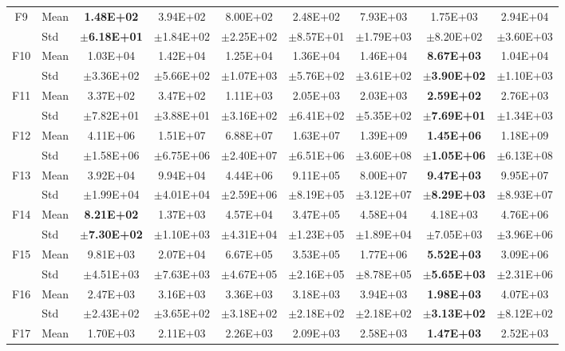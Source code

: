 \begin{table}[htbp]
{\begin{tabular}{clccccccc}
F9 & Mean & \textbf{1.48E+02} & 3.94E+02 & 8.00E+02 & 2.48E+02 & 7.93E+03 & 1.75E+03 & 2.94E+04 \\
 & Std & $\pm$\textbf{6.18E+01} & $\pm$1.84E+02 & $\pm$2.25E+02 & $\pm$8.57E+01 & $\pm$1.79E+03 & $\pm$8.20E+02 & $\pm$3.60E+03 \\
F10 & Mean & 1.03E+04 & 1.42E+04 & 1.25E+04 & 1.36E+04 & 1.46E+04 & \textbf{8.67E+03} & 1.04E+04 \\
 & Std & $\pm$3.36E+02 & $\pm$5.66E+02 & $\pm$1.07E+03 & $\pm$5.76E+02 & $\pm$3.61E+02 & $\pm$\textbf{3.90E+02} & $\pm$1.10E+03 \\
F11 & Mean & 3.37E+02 & 3.47E+02 & 1.11E+03 & 2.05E+03 & 2.03E+03 & \textbf{2.59E+02} & 2.76E+03 \\
 & Std & $\pm$7.82E+01 & $\pm$3.88E+01 & $\pm$3.16E+02 & $\pm$6.41E+02 & $\pm$5.35E+02 & $\pm$\textbf{7.69E+01} & $\pm$1.34E+03 \\
F12 & Mean & 4.11E+06 & 1.51E+07 & 6.88E+07 & 1.63E+07 & 1.39E+09 & \textbf{1.45E+06} & 1.18E+09 \\
 & Std & $\pm$1.58E+06 & $\pm$6.75E+06 & $\pm$2.40E+07 & $\pm$6.51E+06 & $\pm$3.60E+08 & $\pm$\textbf{1.05E+06} & $\pm$6.13E+08 \\
F13 & Mean & 3.92E+04 & 9.94E+04 & 4.44E+06 & 9.11E+05 & 8.00E+07 & \textbf{9.47E+03} & 9.95E+07 \\
 & Std & $\pm$1.99E+04 & $\pm$4.01E+04 & $\pm$2.59E+06 & $\pm$8.19E+05 & $\pm$3.12E+07 & $\pm$\textbf{8.29E+03} & $\pm$8.93E+07 \\
F14 & Mean & \textbf{8.21E+02} & 1.37E+03 & 4.57E+04 & 3.47E+05 & 4.58E+04 & 4.18E+03 & 4.76E+06 \\
 & Std & $\pm$\textbf{7.30E+02} & $\pm$1.10E+03 & $\pm$4.31E+04 & $\pm$1.23E+05 & $\pm$1.89E+04 & $\pm$7.05E+03 & $\pm$3.96E+06 \\
F15 & Mean & 9.81E+03 & 2.07E+04 & 6.67E+05 & 3.53E+05 & 1.77E+06 & \textbf{5.52E+03} & 3.09E+06 \\
 & Std & $\pm$4.51E+03 & $\pm$7.63E+03 & $\pm$4.67E+05 & $\pm$2.16E+05 & $\pm$8.78E+05 & $\pm$\textbf{5.65E+03} & $\pm$2.31E+06 \\
F16 & Mean & 2.47E+03 & 3.16E+03 & 3.36E+03 & 3.18E+03 & 3.94E+03 & \textbf{1.98E+03} & 4.07E+03 \\
 & Std & $\pm$2.43E+02 & $\pm$3.65E+02 & $\pm$3.18E+02 & $\pm$2.18E+02 & $\pm$2.18E+02 & $\pm$\textbf{3.13E+02} & $\pm$8.12E+02 \\
F17 & Mean & 1.70E+03 & 2.11E+03 & 2.26E+03 & 2.09E+03 & 2.58E+03 & \textbf{1.47E+03} & 2.52E+03 \\

\end{tabular}}
\end{table}
